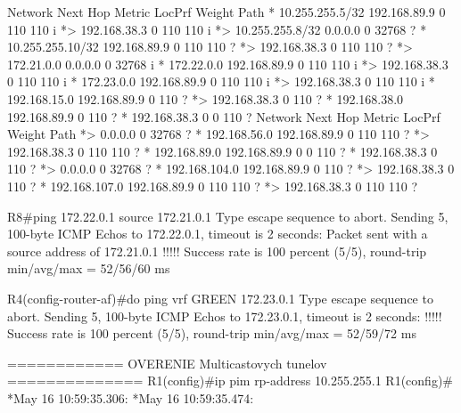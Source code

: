 \documentclass[12pt,twoside,a4paper]{report}
\begin{document}
     Network          Next Hop            Metric LocPrf Weight Path
 *   10.255.255.5/32  192.168.89.9                           0 110 110 i
 *>                   192.168.38.3                           0 110 110 i
 *>  10.255.255.8/32  0.0.0.0                  0         32768 ?
 *   10.255.255.10/32 192.168.89.9                           0 110 110 ?
 *>                   192.168.38.3                           0 110 110 ?
 *>  172.21.0.0       0.0.0.0                  0         32768 i
 *   172.22.0.0       192.168.89.9                           0 110 110 i
 *>                   192.168.38.3                           0 110 110 i
 *   172.23.0.0       192.168.89.9                           0 110 110 i
 *>                   192.168.38.3                           0 110 110 i
 *   192.168.15.0     192.168.89.9                           0 110 ?
 *>                   192.168.38.3                           0 110 ?
 *   192.168.38.0     192.168.89.9                           0 110 ?
 *                    192.168.38.3             0             0 110 ?
     Network          Next Hop            Metric LocPrf Weight Path
 *>                   0.0.0.0                  0         32768 ?
 *   192.168.56.0     192.168.89.9                           0 110 110 ?
 *>                   192.168.38.3                           0 110 110 ?
 *   192.168.89.0     192.168.89.9             0             0 110 ?
 *                    192.168.38.3                           0 110 ?
 *>                   0.0.0.0                  0         32768 ?
 *   192.168.104.0    192.168.89.9                           0 110 ?
 *>                   192.168.38.3                           0 110 ?
 *   192.168.107.0    192.168.89.9                           0 110 110 ?
 *>                   192.168.38.3                           0 110 110 ?







R8#ping 172.22.0.1 source 172.21.0.1
Type escape sequence to abort.
Sending 5, 100-byte ICMP Echos to 172.22.0.1, timeout is 2 seconds:
Packet sent with a source address of 172.21.0.1 
!!!!!
Success rate is 100 percent (5/5), round-trip min/avg/max = 52/56/60 ms





R4(config-router-af)#do ping vrf GREEN 172.23.0.1
Type escape sequence to abort.
Sending 5, 100-byte ICMP Echos to 172.23.0.1, timeout is 2 seconds:
!!!!!
Success rate is 100 percent (5/5), round-trip min/avg/max = 52/59/72 ms



============
OVERENIE Multicastovych tunelov 
==============
R1(config)#ip pim rp-address 10.255.255.1
R1(config)#
*May 16 10:59:35.306: %
*May 16 10:59:35.474: %
\end{document}
